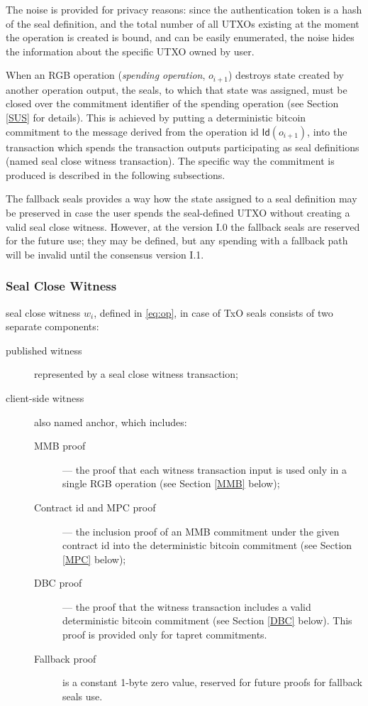 \documentclass[9pt,oneside]{amsart}
\begin{document}
\begin{multicols}{2}
The noise is provided for privacy reasons:
since the \gls{authentication token} is a hash of the seal definition,
and the total number of all UTXOs existing at the moment the operation is created is bound,
and can be easily enumerated, the noise hides the information about the specific UTXO owned by user.

When an RGB operation (\emph{spending operation}, $o_{i+1}$) destroys state
created by another operation output, the seals, to which that state was assigned,
must be closed over the commitment identifier of the spending operation
(see Section \ref{SUS} for details).
This is achieved by putting a deterministic bitcoin commitment to
the message derived from the operation id $\mathsf{Id}(o_{i+1})$,
into the transaction which spends the transaction outputs participating as seal definitions
(named \gls{seal close witness transaction}).
The specific way the commitment is produced is described in the following subsections.

The \glspl{fallback seal} provides a way how the state assigned to a seal definition
may be preserved in case the user spends the seal-defined UTXO without creating a valid \gls{seal close witness}.
However, at the version I.0 the \glspl{fallback seal} are reserved for the future use;
they may be defined, but any spending with a fallback path will be invalid
until the consensus version I.1.

\subsubsection{Seal Close Witness}\label{Witness}

\Gls{seal close witness} $w_i$, defined in \ref{eq:op}, in case of TxO seals consists of two
separate components:
\begin{description}
\item[\Gls{published witness}] represented by a \gls{seal close witness transaction};
\item[\Gls{client-side witness}] also named \gls{anchor},
    which includes:
    \begin{description}
    \item[MMB proof] — the proof that each witness transaction input
        is used only in a single RGB operation (see Section \ref{MMB} below);
    \item[Contract id and MPC proof] — the inclusion proof of an MMB commitment
        under the given contract id into the deterministic bitcoin commitment
        (see Section \ref{MPC} below);
    \item[DBC proof] — the proof that the witness transaction includes
        a valid deterministic bitcoin commitment (see Section \ref{DBC} below).
        This proof is provided only for tapret commitments.
    \item[Fallback proof] is a constant 1-byte zero value,
        reserved for future proofs for \glspl{fallback seal} use.
    \end{description}
\end{description}



\end{multicols}
\end{document}
